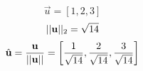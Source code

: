 \begin{example}
    $$ \vec{u} = [1, 2, 3] $$
    $$ ||\mathbf{u}||_2 = \sqrt{14} $$
    $$ \hat{\mathbf{u}} = \frac{\mathbf{u}}{||\mathbf{u}||} = \left[ \frac{1}{\sqrt{14}}, \frac{2}{\sqrt{14}}, \frac{3}{\sqrt{14}} \right] $$
\end{example}